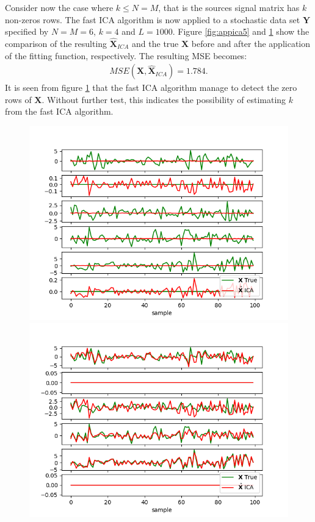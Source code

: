 Consider now the case where $k \leq N=M$, that is the sources signal matrix has $k$ non-zeros rows. 
The fast ICA algorithm is now applied to a stochastic data set $\textbf{Y} $ specified by $N=M=6$, $k = 4$ and $L=1000$. Figure \ref{fig:appica5} and \ref{fig:appica6} show the comparison of the resulting $\hat{\textbf{X}}_{ICA}$ and the true $\textbf{X}$ before and after the application of the fitting function, respectively. The resulting MSE becomes:
\begin{align*}
MSE(\textbf{X},\hat{\textbf{X}}_{ICA}) = 1.784.
\end{align*} 
It is seen from figure \ref{fig:appica6} that the fast ICA algorithm manage to  detect the zero rows of $\textbf{X}$. Without further test, this indicates the possibility of estimating $k$ from the fast ICA algorithm. 
\begin{figure}[H]
    \begin{minipage}[t]{.45\textwidth}
		\centering
		\includegraphics[scale=0.5]{figures/ICAapp/ICA_app5.png}
	\caption{}
	\label{fig:appica5}
    \end{minipage} 
    \hfill
    \begin{minipage}[t]{.45\textwidth}
		\centering
		\includegraphics[scale=0.5]{figures/ICAapp/ICA_app6.png}
	\caption{}
	\label{fig:appica6}
    \end{minipage}
\end{figure}

